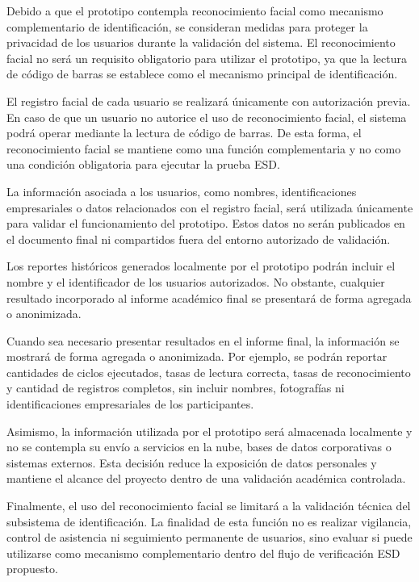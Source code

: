 Debido a que el prototipo contempla reconocimiento facial como mecanismo
complementario de identificación, se consideran medidas para proteger la
privacidad de los usuarios durante la validación del sistema. El reconocimiento
facial no será un requisito obligatorio para utilizar el prototipo, ya que la
lectura de código de barras se establece como el mecanismo principal de
identificación.

El registro facial de cada usuario se realizará únicamente con autorización
previa. En caso de que un usuario no autorice el uso de reconocimiento facial,
el sistema podrá operar mediante la lectura de código de barras. De esta forma,
el reconocimiento facial se mantiene como una función complementaria y no como
una condición obligatoria para ejecutar la prueba ESD.

La información asociada a los usuarios, como nombres, identificaciones
empresariales o datos relacionados con el registro facial, será utilizada
únicamente para validar el funcionamiento del prototipo. Estos datos no serán
publicados en el documento final ni compartidos fuera del entorno autorizado de
validación.

Los reportes históricos generados localmente por el prototipo podrán incluir el
nombre y el identificador de los usuarios autorizados. No obstante, cualquier
resultado incorporado al informe académico final se presentará de forma agregada
o anonimizada.

Cuando sea necesario presentar resultados en el informe final, la información se
mostrará de forma agregada o anonimizada. Por ejemplo, se podrán reportar
cantidades de ciclos ejecutados, tasas de lectura correcta, tasas de
reconocimiento y cantidad de registros completos, sin incluir nombres,
fotografías ni identificaciones empresariales de los participantes.

Asimismo, la información utilizada por el prototipo será almacenada localmente y
no se contempla su envío a servicios en la nube, bases de datos corporativas o
sistemas externos. Esta decisión reduce la exposición de datos personales y
mantiene el alcance del proyecto dentro de una validación académica controlada.

Finalmente, el uso del reconocimiento facial se limitará a la validación técnica
del subsistema de identificación. La finalidad de esta función no es realizar
vigilancia, control de asistencia ni seguimiento permanente de usuarios, sino
evaluar si puede utilizarse como mecanismo complementario dentro del flujo de
verificación ESD propuesto.
